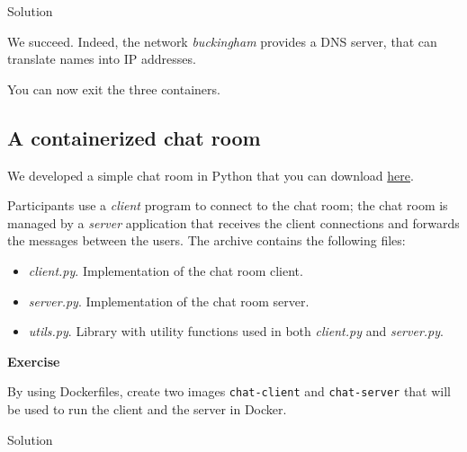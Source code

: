 \documentclass[
]{article}
\providecommand{\tightlist}{%
  \setlength{\itemsep}{0pt}\setlength{\parskip}{0pt}}
\newenvironment{infobox}[1]
  {
  \begin{itemize}
  \renewcommand{\labelitemi}{
    \raisebox{-.7\height}[0pt][0pt]{
      
    }
  }
  \setlength{\fboxsep}{1em}
  \begin{whitebox}
  \item
  }
  {
  \end{whitebox}
  \end{itemize}
  }
\theoremstyle{definition}
\theoremstyle{definition}
\theoremstyle{definition}
\theoremstyle{remark}
\let\BeginKnitrBlock\begin \let\EndKnitrBlock\end
\begin{document}
Solution

\begin{infobox}{exercisebox}

We succeed. Indeed, the network \emph{buckingham} provides a DNS server, that
can translate names into IP addresses.

\end{infobox}

You can now exit the three containers.

\hypertarget{a-containerized-chat-room}{%
\subsection{A containerized chat room}\label{a-containerized-chat-room}}

We developed a simple chat room in Python that you can download
\href{/courses/cloud-computing/chat-room.zip}{here}.

Participants use a \emph{client} program to connect to the chat room;
the chat room is managed by a \emph{server} application that receives the
client connections and forwards the messages between the users.
The archive contains the following files:

\begin{itemize}
\tightlist
\item
  \emph{client.py}. Implementation of the chat room client.
\item
  \emph{server.py}. Implementation of the chat room server.
\item
  \emph{utils.py}. Library with utility functions used
  in both \emph{client.py} and \emph{server.py}.
\end{itemize}

\begin{infobox}{exercisebox}

\textbf{Exercise}

\BeginKnitrBlock{exercise}
\protect\hypertarget{exr:unnamed-chunk-39}{}{\label{exr:unnamed-chunk-39} }By using Dockerfiles, create two images \texttt{chat-client} and \texttt{chat-server}
that will be used to run the client and the server in Docker.
\EndKnitrBlock{exercise}

\end{infobox}

Solution
\end{document}
